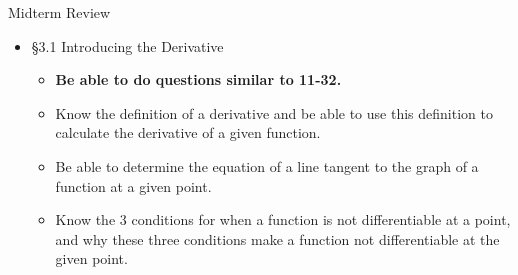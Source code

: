 \documentclass[cal1spr16Lectures.tex]{subfiles}
\begin{document}
\begin{frame}[allowframebreaks]{Midterm Review}
\begin{itemize}
\framebreak
\item \S 3.1 Introducing the Derivative
	\begin{itemize}\footnotesize
	\item {\bf Be able to do questions similar to 11-32.}
	\item Know the definition of a derivative and be able to use this definition to calculate the derivative of a given function.
	\item Be able to determine the equation of a line tangent to the graph of a function at a given point.
	\item Know the 3 conditions for when a function is not differentiable at a point, and why these three conditions make a function not differentiable at the given point.
	\end{itemize}


\end{itemize}
\end{frame}
\end{document}
